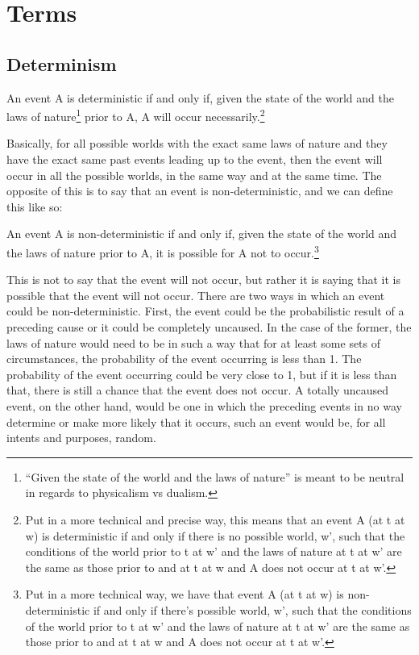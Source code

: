 \section{Terms}
\subsection{Determinism}
\begin{center}An event A is deterministic if and only if, given the state of the world and the laws of nature\footnote{“Given the state of the world and the laws of nature” is meant to be neutral in regards to physicalism vs dualism.}  prior to A, A will occur necessarily.\footnote{Put in a more technical and precise way, this means that an event A (at t at w) is deterministic if and only if there is no possible world, w’, such that the conditions of the world prior to t at w’ and the laws of nature at t at w’ are the same as those prior to and at t at w and A does not occur at t at w’.}\end{center} 
Basically, for all possible worlds with the exact same laws of nature and they have the exact same past events leading up to the event, then the event will occur in all the possible worlds, in the same way and at the same time. The opposite of this is to say that an event is non-deterministic, and we can define this like so:
\begin{center}An event A is non-deterministic if and only if, given the state of the world and the laws of nature prior to A, it is possible for A not to occur.\footnote{Put in a more technical way, we have that event A (at t at w) is non-deterministic if and only if there’s possible world, w’, such that the conditions of the world prior to t at w’ and the laws of nature at t at w’ are the same as those prior to and at t at w and A does not occur at t at w’.}\end{center} 
This is not to say that the event will not occur, but rather it is saying that it is possible that the event will not occur. There are two ways in which an event could be non-deterministic. First, the event could be the probabilistic result of a preceding cause or it could be completely uncaused. In the case of the former, the laws of nature would need to be in such a way that for at least some sets of circumstances, the probability of the event occurring is less than 1. The probability of the event occurring could be very close to 1, but if it is less than that, there is still a chance that the event does not occur. A totally uncaused event, on the other hand, would be one in which the preceding events in no way determine or make more likely that it occurs, such an event would be, for all intents and purposes, random.

